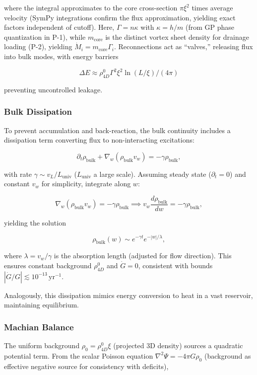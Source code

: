 where the integral approximates to the core cross-section $\pi \xi^2$ times average velocity (SymPy integrations confirm the flux approximation, yielding exact factors independent of cutoff). Here, $\Gamma = n \kappa$ with $\kappa = h / m$ (from GP phase quantization in P-1), while $m_{\text{core}}$ is the distinct vortex sheet density for drainage loading (P-2), yielding $\dot{M}_i = m_{\text{core}} \Gamma_i$. Reconnections act as ``valves,'' releasing flux into bulk modes, with energy barriers

\begin{equation}
\Delta E \approx \rho_{4D}^0 \Gamma^2 \xi^2 \ln(L / \xi) / (4\pi)
\end{equation}

preventing uncontrolled leakage.

\subsubsection{Bulk Dissipation}
To prevent accumulation and back-reaction, the bulk continuity includes a dissipation term converting flux to non-interacting excitations:

\begin{equation}
\partial_t \rho_{\text{bulk}} + \nabla_w (\rho_{\text{bulk}} v_w) = -\gamma \rho_{\text{bulk}},
\end{equation}

with rate $\gamma \sim v_L / L_{\text{univ}}$ ($L_{\text{univ}}$ a large scale). Assuming steady state ($\partial_t = 0$) and constant $v_w$ for simplicity, integrate along $w$:

\[
\nabla_w (\rho_{\text{bulk}} v_w) = -\gamma \rho_{\text{bulk}} \implies v_w \frac{d \rho_{\text{bulk}}}{dw} = -\gamma \rho_{\text{bulk}},
\]

yielding the solution

\begin{equation}
\rho_{\text{bulk}}(w) \sim e^{-\gamma t} e^{-|w| / \lambda},
\end{equation}

where $\lambda = v_w / \gamma$ is the absorption length (adjusted for flow direction). This ensures constant background $\rho_{4D}^0$ and $\dot{G} = 0$, consistent with bounds $|\dot{G}/G| \lesssim 10^{-13} \, \mathrm{yr}^{-1}$.

Analogously, this dissipation mimics energy conversion to heat in a vast reservoir, maintaining equilibrium.

\subsubsection{Machian Balance}
The uniform background $\rho_0 = \rho_{4D}^0 \xi$ (projected 3D density) sources a quadratic potential term. From the scalar Poisson equation $\nabla^2 \Psi = -4\pi G \rho_0$ (background as effective negative source for consistency with deficits),

